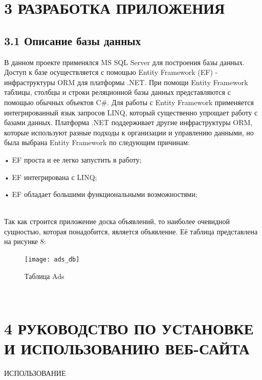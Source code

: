 \documentclass[14pt,a4paper]{extreport}
\begin{document}
	\newpage
	\section*{\normalsize\hspace{4ex}3 РАЗРАБОТКА ПРИЛОЖЕНИЯ}
	\subsection*{\normalsize\hspace{4ex}3.1 Описание базы данных}
	\parindent=1cm В данном проекте применялся MS SQL Server для построения базы данных. Доступ к базе осуществляется с помощью Entity Framework (EF) - инфраструктуры ORM для платформы .NET. При помощи Entity Framework таблицы, столбцы и строки реляционной базы данных представляются с помощью обычных объектов C\#. Для работы с Entity Framework применяется интегрированный язык запросов LINQ, который существенно упрощает работу с базами данных. Платформа .NET поддерживает другие инфраструктуры ORM, которые используют разные подходы к орга\-низации и управлению данными, но была выбрана Entity Framework по следующим причинам:\par
	• EF проста и ее легко запустить в работу;\par
	• EF интегрирована с LINQ;\par
	• EF обладает большими функциональными возможностями;\par
	~\\ 
	Так как строится приложение доска объявлений, то наиболее очевидной сущностью, которая понадобится, является объявление. Её таблица представлена на рисунке 8:
	\begin{figure}[h]
	\begin{center}
	\texttt{[image: ads\_db]}
	\caption{ Таблица Ads}
	\end{center}
	\end{figure}
	~\\


	\newpage
	\section*{\normalsize\hspace{4ex}4 РУКОВОДСТВО ПО УСТАНОВКЕ И ИСПОЛЬЗОВАНИЮ ВЕБ-САЙТА}
	\hspace{4ex}ИСПОЛЬЗОВАНИЕ
	\newpage
\end{document}
